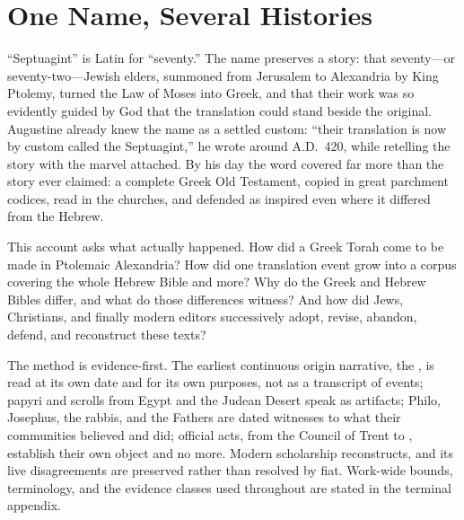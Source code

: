 \section{One Name, Several Histories}

``Septuagint'' is Latin for ``seventy.'' The name preserves a story: that
seventy---or seventy-two---Jewish elders, summoned from Jerusalem to
Alexandria by King Ptolemy, turned the Law of Moses into Greek, and that
their work was so evidently guided by God that the translation could stand
beside the original. Augustine already knew the name as a settled custom:
``their translation is now by custom called the Septuagint,'' he wrote around
A.D.~420, while retelling the story with the marvel
attached. By his day the word covered far
more than the story ever claimed: a complete Greek Old Testament, copied in
great parchment codices, read in the churches, and defended as inspired even
where it differed from the Hebrew.

This account asks what actually happened. How did a Greek Torah come to be
made in Ptolemaic Alexandria? How did one translation event grow into a
corpus covering the whole Hebrew Bible and more? Why do the Greek and Hebrew
Bibles differ, and what do those differences witness? And how did Jews,
Christians, and finally modern editors successively adopt, revise, abandon,
defend, and reconstruct these texts?


The method is evidence-first. The earliest continuous origin narrative, the
, is read at its own date and for its own purposes,
not as a transcript of events; papyri and scrolls from Egypt and the Judean
Desert speak as artifacts; Philo, Josephus, the rabbis, and the Fathers are
dated witnesses to what their communities believed and did; official acts,
from the Council of Trent to , establish their own object
and no more. Modern scholarship reconstructs, and its live disagreements are
preserved rather than resolved by fiat. Work-wide bounds, terminology, and
the evidence classes used throughout are stated in the terminal appendix.

